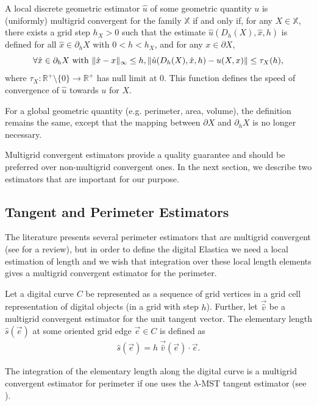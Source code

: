 \documentclass[smallextended]{svjour3}       %
\DeclarePairedDelimiter\norm{\lVert}{\rVert}%
\begin{document}
\begin{definition}
  A local discrete geometric estimator $\hat{u}$ of some geometric
  quantity $u$ is (uniformly) multigrid convergent for the family $\mathbb{X}$ if
  and only if, for any $X \in \mathbb{X}$, there exists a grid step
  $h_X>0$ such that the estimate $\hat{u}(D_h(X),\hat{x},h)$ is
  defined for all $\hat{x} \in \partial_hX$ with $ 0 < h < h_X$, and
  for any $x \in \partial X$,
  \begin{equation*}
    \forall \hat{x} \in  \partial_hX \text{ with } \norm{ \hat{x} - x }_{\infty} \leq h, \norm{ \hat{u}(D_h(X),\hat{x},h) - u(X,x)} \leq \tau_{X}(h),			
  \end{equation*}
  where $\tau_{X}:\mathbb{R}^{+}\setminus\{0\} \rightarrow
  \mathbb{R}^{+}$ has null limit at $0$. This function defines the
  speed of convergence of $\hat{u}$ towards $u$ for $X$.
\end{definition}
	
For a global geometric quantity (e.g. perimeter, area, volume), the definition remains the same, except that the mapping
between $\partial X$ and $\partial_h X$ is no longer necessary.
	
Multigrid convergent estimators provide a quality guarantee and should
be preferred over non-multigrid convergent ones. In the next section,
we describe two estimators that are important for our purpose.

\subsection{Tangent and Perimeter Estimators}

The literature presents several perimeter estimators that are multigrid convergent (see
\cite{coeurjolly04comparative,coeurjolly12multigrid} for a review), but in order to define the digital Elastica we need a local estimation
of length and we wish that integration over these local length elements gives a multigrid convergent estimator for the
perimeter.

\begin{definition}
  Let a digital curve $C$ be represented as a sequence of grid vertices in a grid cell representation of digital objects (in a grid with step $h$). Further, let $\vec{ \hat{v} }$ be a multigrid convergent estimator for the unit tangent vector. The elementary length $\hat{s}(\vec{e})$ at some oriented grid edge $ \vec{e} \in C$ is defined as
  \begin{align*}
    \hat{s}(\vec{e}) = h ~\vec{\hat{v}}(\vec{e}) \cdot \vec{e}.
  \end{align*}
\end{definition}
The integration of the elementary length along the digital curve is a multigrid convergent estimator for perimeter if
one uses the $\lambda$-MST \cite{lachaud07tangent} tangent estimator (see \cite{lachaud06hdr}).
\end{document}

